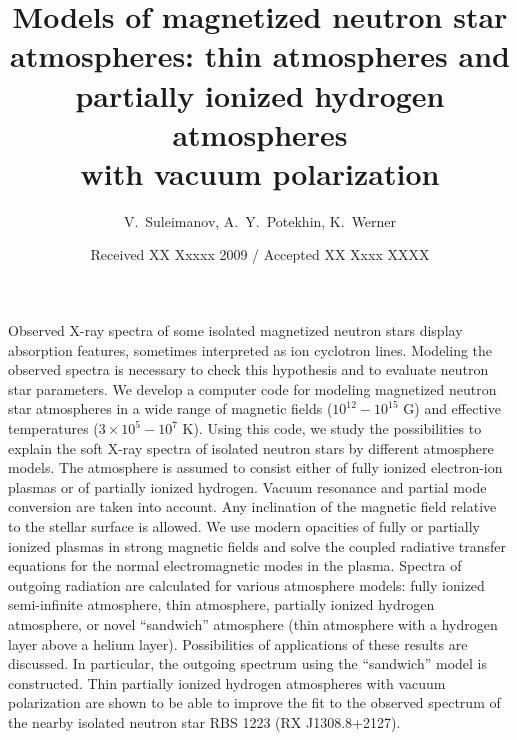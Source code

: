 \documentclass{aa}
\begin{document}
%                            
\voffset=-1.0cm
\newcommand{\be}{\begin{equation}}
\newcommand{\ee}{\end{equation}}
\newcommand{\bea}{\begin{eqnarray}}  
\newcommand{\eea}{\end{eqnarray}}

\title{Models of magnetized neutron star atmospheres: thin atmospheres
and partially ionized hydrogen atmospheres \\ with vacuum polarization}


\author{
V.~Suleimanov,
A.~Y.~Potekhin,
K.~Werner}



\date{Received XX Xxxxx 2009 / Accepted XX Xxxx XXXX}



\abstract
{Observed X-ray spectra of some isolated magnetized neutron stars 
display absorption features,
sometimes interpreted as ion cyclotron lines. Modeling the observed spectra is
necessary to check this hypothesis and to evaluate neutron star parameters.} 
{We develop a computer code for modeling magnetized neutron star atmospheres
in a wide range of magnetic fields ($10^{12} - 10^{15}$ G) and
effective temperatures ($3 \times 10^5 - 10^7$ K).
Using this code, we study the possibilities to explain the soft X-ray
spectra of isolated neutron stars
by different atmosphere models.}
{The atmosphere is assumed to consist either of
fully ionized electron-ion plasmas or
of partially ionized hydrogen.
Vacuum resonance and partial mode conversion are taken into account.
Any inclination of the magnetic field relative
to the stellar surface is allowed.
We use modern opacities of fully or partially ionized plasmas
in strong magnetic fields and solve the coupled radiative transfer equations
for the normal electromagnetic modes in the plasma.}
{Spectra of outgoing radiation are calculated for various atmosphere models:
fully ionized semi-infinite atmosphere, thin atmosphere, 
partially ionized hydrogen atmosphere,
or novel ``sandwich'' atmosphere
(thin atmosphere with a hydrogen layer above a helium
layer).
Possibilities of applications of these results are discussed.
 In particular, the outgoing spectrum
using the ``sandwich'' model is constructed.
Thin partially ionized hydrogen atmospheres with
vacuum polarization are shown
to be able to improve
 the fit  to the observed spectrum
of the nearby isolated neutron star RBS 1223 (RX J1308.8+2127).}
{}
%
\end{document}
